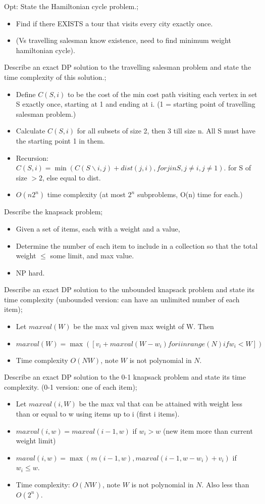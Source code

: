 \documentclass{article}
\begin{document}
Opt: State the Hamiltonian cycle problem.; \begin{itemize} \item Find if there EXISTS a tour that visits every city exactly once.  \item (Vs travelling salesman know existence, need to find minimum weight hamiltonian cycle).  \end{itemize}

Describe an exact DP solution to the travelling salesman problem and state the time complexity of this solution.; \begin{itemize} \item Define $C(S,i)$ to be the cost of the min cost path visiting each vertex in set S exactly once, starting at 1 and ending at i. (1 = starting point of travelling salesman problem.) \item Calculate $C(S,i)$ for all subsets of size 2, then 3 till size n. All S must have the starting point 1 in them.  \item Recursion: $C(S, i)=\min( C(S \backslash i, j) + dist(j, i), for j in S, j \ne i, j \ne 1)$. for S of size $>2$, else equal to dist.  \item $O(n2^n)$ time complexity (at most $2^n$ subproblems, O(n) time for each.) \end{itemize} 

Describe the knapsack problem; \begin{itemize} \item Given a set of items, each with a weight and a value, \item Determine the number of each item to include in a collection so that the total weight $\leq$ some limit, and max value.  \item NP hard.  \end{itemize}

Describe an exact DP solution to the unbounded knapsack problem and state its time complexity (unbounded version: can have an unlimited number of each item); \begin{itemize} \item Let $maxval(W)$ be the max val given max weight of W. Then \item $maxval(W) = \max([v_i + maxval(W-w_i) for i in range(N) if w_i <W])$ \item Time complexity $O(NW)$, note $W$ is not polynomial in $N$.  \end{itemize}

Describe an exact DP solution to the 0-1 knapsack problem and state its time complexity. (0-1 version: one of each item); \begin{itemize} \item Let $maxval(i, W)$ be the max val that can be attained with weight less than or equal to w using items up to i (first i items).  \item $maxval(i, w)=maxval(i-1, w)$ if $w_i > w$ (new item more than current weight limit) \item $maval(i, w)=\max(m(i-1, w), maxval(i-1, w-w_i)+v_i)$ if $w_i \leq w$.  \item Time complexity: $O(NW)$, note $W$ is not polynomial in $N$. Also less than $O(2^n)$.  \end{itemize}
\end{document}
